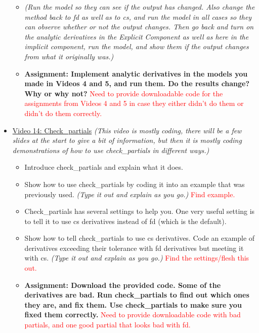 \documentclass[12pt, letterpaper]{article}
\begin{document}
\begin{itemize}
\begin{itemize}
			\item \textit{(Run the model so they can see if the output has changed. Also change the method back to fd as well as to cs, and run the model in all cases so they can observe whether or not the output changes. Then go back and turn on the analytic derivatives in the Explicit Component as well as here in the implicit component, run the model, and show them if the output changes from what it originally was.)}
			\item \textbf{Assignment: Implement analytic derivatives in the models you made in Videos 4 and 5, and run them. Do the results change? Why or why not?} \textcolor{red}{Need to provide downloadable code for the assignments from Videos 4 and 5 in case they either didn't do them or didn't do them correctly.}
		\end{itemize}

	\item \underline{Video 14: Check\_partials} \textit{(This video is mostly coding, there will be a few slides at the start to give a bit of information, but then it is mostly coding demonstrations of how to use check\_partials in different ways.)}
		\begin{itemize}
			\item Introduce check\_partials and explain what it does.
			\item Show how to use check\_partials by coding it into an example that was previously used. \textit{(Type it out and explain as you go.)} \textcolor{red}{Find example.}
			\item Check\_partials has several settings to help you. One very useful setting is to tell it to use cs derivatives instead of fd (which is the default).
			\item Show how to tell check\_partials to use cs derivatives. Code an example of derivatives exceeding their tolerance with fd derivatives but meeting it with cs. \textit{(Type it out and explain as you go.)} \textcolor{red}{Find the settings/flesh this out.}
			\item \textbf{Assignment: Download the provided code. Some of the derivatives are bad. Run check\_partials to find out which ones they are, and fix them. Use check\_partials to make sure you fixed them correctly.} \textcolor{red}{Need to provide downloadable code with bad partials, and one good partial that looks bad with fd.}
		\end{itemize}


\end{itemize}
\end{document}

